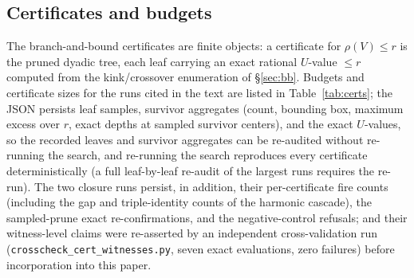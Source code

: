 \documentclass[11pt,a4paper]{article}
\numberwithin{equation}{section}
\theoremstyle{plain}
\theoremstyle{definition}
\theoremstyle{remark}
\begin{document}
\subsection{Certificates and budgets}

The branch-and-bound certificates are finite objects: a certificate for
$\rho(V)\le r$ is the pruned dyadic tree, each leaf carrying an exact
rational $U$-value $\le r$ computed from the kink/crossover enumeration
of \S\ref{sec:bb}. Budgets and certificate sizes for the runs cited in
the text are listed in Table~\ref{tab:certs}; the JSON persists leaf
samples, survivor aggregates (count, bounding box, maximum excess over
$r$, exact depths at sampled survivor centers), and the exact
$U$-values, so the recorded leaves and survivor aggregates can be
re-audited without re-running the search, and re-running the search
reproduces every certificate deterministically (a full leaf-by-leaf
re-audit of the largest runs requires the re-run).
The two closure runs persist, in addition, their per-certificate fire
counts (including the gap and triple-identity counts of the harmonic
cascade), the sampled-prune exact re-confirmations, and the
negative-control refusals; and their witness-level claims were
re-asserted by an independent cross-validation run
(\texttt{crosscheck\_cert\_witnesses.py}, seven exact evaluations,
zero failures) before incorporation into this paper.
\end{document}
